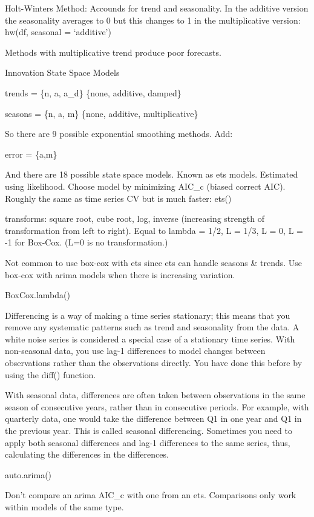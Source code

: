 \documentclass[]{book}
\begin{document}
Holt-Winters Method: Accounds for trend and seasonality. In the additive
version the seasonality averages to 0 but this changes to 1 in the
multiplicative version: hw(df, seasonal = `additive')

Methods with multiplicative trend produce poor forecasts.

Innovation State Space Models

trends = \{n, a, a\_d\} \{none, additive, damped\}

seasons = \{n, a, m\} \{none, additive, multiplicative\}

So there are 9 possible exponential smoothing methods. Add:

error = \{a,m\}

And there are 18 possible state space models. Known as ets models.
Estimated using likelihood. Choose model by minimizing AIC\_c (biased
correct AIC). Roughly the same as time series CV but is much faster:
ets()

transforms: square root, cube root, log, inverse (increasing strength of
transformation from left to right). Equal to lambda = 1/2, L = 1/3, L =
0, L = -1 for Box-Cox. (L=0 is no transformation.)

Not common to use box-cox with ets since ets can handle seasons \&
trends. Use box-cox with arima models when there is increasing
variation.

BoxCox.lambda()

Differencing is a way of making a time series stationary; this means
that you remove any systematic patterns such as trend and seasonality
from the data. A white noise series is considered a special case of a
stationary time series. With non-seasonal data, you use lag-1
differences to model changes between observations rather than the
observations directly. You have done this before by using the diff()
function.

With seasonal data, differences are often taken between observations in
the same season of consecutive years, rather than in consecutive
periods. For example, with quarterly data, one would take the difference
between Q1 in one year and Q1 in the previous year. This is called
seasonal differencing. Sometimes you need to apply both seasonal
differences and lag-1 differences to the same series, thus, calculating
the differences in the differences.

auto.arima()

Don't compare an arima AIC\_c with one from an ets. Comparisons only
work within models of the same type.
\end{document}
